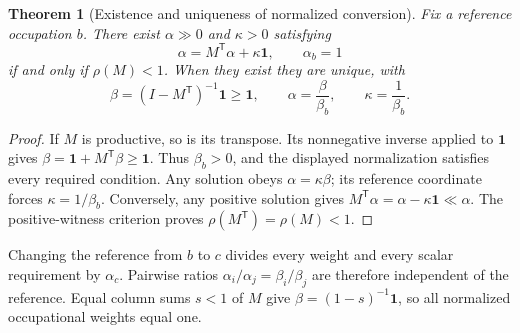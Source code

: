 \documentclass[11pt,a4paper]{article}
\newtheorem{theorem}{Theorem}[section]
\begin{document}
\begin{theorem}[Existence and uniqueness of normalized conversion]
Fix a reference occupation $b$. There exist $\alpha\gg0$ and $\kappa>0$ satisfying
\begin{equation}
\alpha=M^{\mathsf T}\alpha+\kappa\mathbf1,\qquad \alpha_b=1
\end{equation}
if and only if $\rho(M)<1$. When they exist they are unique, with
\begin{equation}
\beta=(I-M^{\mathsf T})^{-1}\mathbf1\geq\mathbf1,
\qquad \alpha=\frac{\beta}{\beta_b},\qquad \kappa=\frac1{\beta_b}.
\end{equation}
\end{theorem}
\begin{proof}
If $M$ is productive, so is its transpose. Its nonnegative inverse applied to $\mathbf1$ gives $\beta=\mathbf1+M^{\mathsf T}\beta\geq\mathbf1$. Thus $\beta_b>0$, and the displayed normalization satisfies every required condition. Any solution obeys $\alpha=\kappa\beta$; its reference coordinate forces $\kappa=1/\beta_b$. Conversely, any positive solution gives $M^{\mathsf T}\alpha=\alpha-\kappa\mathbf1\ll\alpha$. The positive-witness criterion proves $\rho(M^{\mathsf T})=\rho(M)<1$.
\end{proof}

Changing the reference from $b$ to $c$ divides every weight and every scalar requirement by $\alpha_c$. Pairwise ratios $\alpha_i/\alpha_j=\beta_i/\beta_j$ are therefore independent of the reference. Equal column sums $s<1$ of $M$ give $\beta=(1-s)^{-1}\mathbf1$, so all normalized occupational weights equal one.
\end{document}
